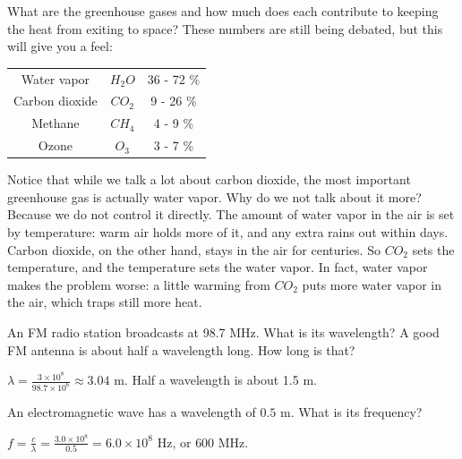 What are the greenhouse gases and how much does each contribute to
keeping the heat from exiting to space?  These numbers are still being
debated, but this will give you a feel:
\begin{tabular}{c | c | c}
  Water vapor & $H_2O$ & 36 - 72 \% \\
  Carbon dioxide & $CO_2$ & 9 - 26 \% \\
  Methane & $CH_4$ & 4 - 9 \% \\
  Ozone & $O_3$ & 3 - 7 \%
\end{tabular}

Notice that while we talk a lot about carbon dioxide, the most important
greenhouse gas is actually water vapor. Why do we not talk about it more?
Because we do not control it directly. The amount of water vapor in the air
is set by temperature: warm air holds more of it, and any extra rains out
within days. Carbon dioxide, on the other hand, stays in the air for
centuries. So $CO_2$ sets the temperature, and the temperature sets the
water vapor. In fact, water vapor makes the problem worse: a little warming
from $CO_2$ puts more water vapor in the air, which traps still more
heat.

\begin{Exercise}[title={FM radio}, label=em_fm]
An FM radio station broadcasts at 98.7 MHz. What is its wavelength? A good
FM antenna is about half a wavelength long. How long is that?
\end{Exercise}
\begin{Answer}[ref=em_fm]
$\lambda = \frac{3 \times 10^8}{98.7 \times 10^6} \approx 3.04$ m. Half a
wavelength is about 1.5 m.
\end{Answer}

\begin{Exercise}[title={Frequency from Wavelength}, label=em2]
An electromagnetic wave has a wavelength of $0.5$ m. What is its frequency?
\end{Exercise}
\begin{Answer}[ref=em2]
$f = \frac{c}{\lambda} = \frac{3.0 \times 10^8}{0.5} = 6.0 \times 10^8$ Hz, or $600$ MHz.
\end{Answer}
